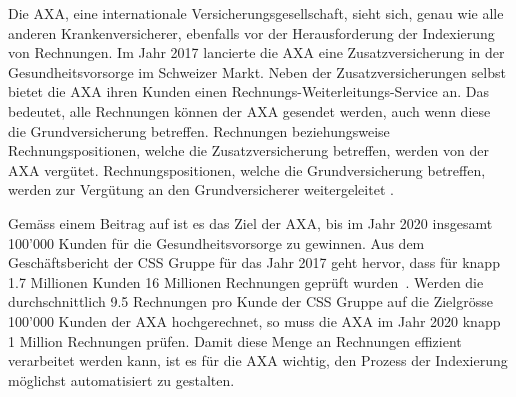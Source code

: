 


Die AXA, eine internationale Versicherungsgesellschaft, sieht sich, genau wie alle anderen Krankenversicherer, ebenfalls vor der Herausforderung der Indexierung von Rechnungen. Im Jahr 2017 lancierte die AXA eine Zusatzversicherung in der Gesundheitsvorsorge im Schweizer Markt. Neben der Zusatzversicherungen selbst bietet die AXA ihren Kunden einen Rechnungs-Weiterleitungs-Service an. Das bedeutet, alle Rechnungen können der AXA gesendet werden, auch wenn diese die Grundversicherung betreffen. Rechnungen beziehungsweise Rechnungspositionen, welche die Zusatzversicherung betreffen, werden von der AXA vergütet. Rechnungspositionen, welche die Grundversicherung betreffen, werden zur Vergütung an den Grundversicherer weitergeleitet \autocite{Finanzen.ch2017}.

Gemäss einem Beitrag auf \textcite{Finanzen.ch2017} ist es das Ziel der AXA, bis im Jahr 2020 insgesamt 100'000 Kunden für die Gesundheitsvorsorge zu gewinnen. Aus dem Geschäftsbericht der CSS Gruppe für das Jahr 2017 geht hervor, dass für knapp 1.7 Millionen Kunden 16 Millionen Rechnungen geprüft wurden~\autocite{CSSGruppe2018}. Werden die durchschnittlich 9.5 Rechnungen pro Kunde der CSS Gruppe auf die Zielgrösse 100'000 Kunden der AXA hochgerechnet, so muss die AXA im Jahr 2020 knapp 1 Million Rechnungen prüfen. Damit diese Menge an Rechnungen effizient verarbeitet werden kann, ist es für die AXA wichtig, den Prozess der Indexierung möglichst automatisiert zu gestalten.

